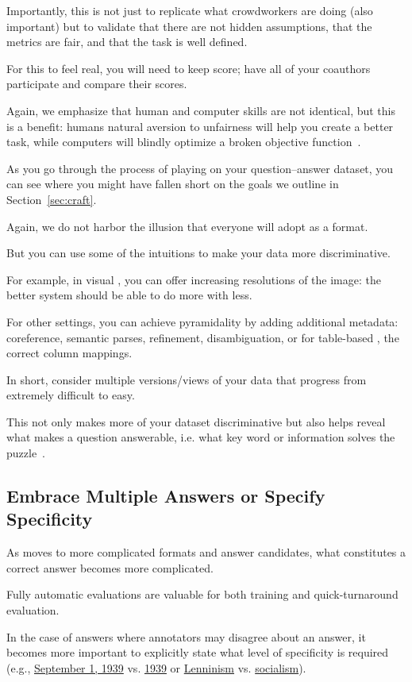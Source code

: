 Importantly, this is not just to replicate what crowdworkers are doing (also important) but to validate that there are not hidden assumptions, that the metrics are fair, and that the task is well defined.

For this to feel real, you will need to keep score; have all of your coauthors participate and compare their scores.

Again, we emphasize that human and computer skills are not identical, but this is a benefit: humans natural aversion to unfairness will help you create a better task, while computers will blindly optimize a broken objective function~\citep{bostrom-03}.

As you go through the process of playing on your question--answer dataset, you can see where you might have fallen short on the goals we outline in Section~\ref{sec:craft}.

Again, we do not harbor the illusion that everyone will adopt \qb{} as a format.

But you can use some of the intuitions to make your data more discriminative.

For example, in visual , you can offer increasing resolutions of the image: the better system should be able to do more with less.

For other settings, you can achieve pyramidality by adding additional metadata: coreference, semantic parses, refinement, disambiguation, or for table-based , the correct column mappings.

In short, consider multiple versions/views of your data that progress from extremely difficult to easy.

This not only makes more of your dataset discriminative but also helps reveal what makes a question answerable, i.e. what key word or information solves the puzzle~\cite[Chapter 10]{klagge-10}.

\subsection{Embrace Multiple Answers or Specify Specificity}

As \qa{} moves to more complicated formats and answer candidates, what constitutes a correct answer becomes more complicated.

Fully automatic evaluations are valuable for both training and quick-turnaround evaluation.

In the case of answers where annotators may disagree about an answer, it becomes more important to explicitly state what level of specificity is required (e.g., \underline{September 1, 1939} vs. \underline{1939} or \underline{Lenninism} vs. \underline{socialism}).

